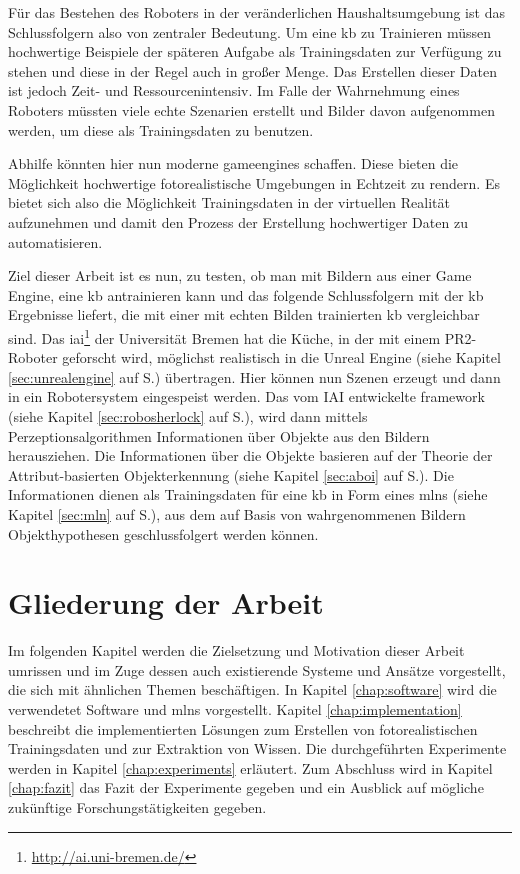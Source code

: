 Für das Bestehen des Roboters in der veränderlichen Haushaltsumgebung ist das Schlussfolgern also von zentraler Bedeutung. Um eine \gls{kb} zu Trainieren müssen hochwertige Beispiele der späteren Aufgabe als Trainingsdaten zur Verfügung zu stehen und diese in der Regel auch in großer Menge. Das Erstellen dieser Daten ist jedoch Zeit- und Ressourcenintensiv. Im Falle der Wahrnehmung eines Roboters müssten viele echte Szenarien erstellt und Bilder davon aufgenommen werden, um diese als Trainingsdaten zu benutzen. \par      
Abhilfe könnten hier nun moderne \glspl{gameengine} schaffen. Diese bieten die Möglichkeit hochwertige fotorealistische Umgebungen in Echtzeit zu rendern. Es bietet sich also die Möglichkeit Trainingsdaten in der virtuellen Realität aufzunehmen und damit den Prozess der Erstellung hochwertiger Daten zu automatisieren. \par  
Ziel dieser Arbeit ist es nun, zu testen, ob man mit Bildern aus einer Game Engine, eine \gls{kb} antrainieren kann und das folgende Schlussfolgern mit der \gls{kb} Ergebnisse liefert, die mit einer mit echten Bilden trainierten \gls{kb} vergleichbar sind. Das \gls{iai}\footnote{\url{http://ai.uni-bremen.de/}} der Universität Bremen hat die Küche, in der mit einem PR2-Roboter geforscht wird, möglichst realistisch in die Unreal Engine (siehe Kapitel \ref{sec:unrealengine} auf S.\pageref{sec:unrealengine}) übertragen. Hier können nun Szenen erzeugt und dann in ein Robotersystem eingespeist werden. Das vom IAI entwickelte \gls{framework} \robosherlock (siehe Kapitel \ref{sec:robosherlock} auf S.\pageref{sec:robosherlock}), wird dann mittels Perzeptionsalgorithmen Informationen über Objekte aus den Bildern herausziehen. Die Informationen über die Objekte basieren auf der Theorie der Attribut-basierten Objekterkennung (siehe Kapitel \ref{sec:aboi} auf S.\pageref{sec:aboi}). Die Informationen dienen als Trainingsdaten für eine \gls{kb} in Form eines \gls{mlns} (siehe Kapitel \ref{sec:mln} auf S.\pageref{sec:mln}), aus dem auf Basis von wahrgenommenen Bildern Objekthypothesen  geschlussfolgert werden können.  

\section{Gliederung der Arbeit}
\label{sec:gliederung}

Im folgenden Kapitel werden die Zielsetzung und Motivation dieser Arbeit umrissen und im Zuge dessen auch existierende Systeme und Ansätze vorgestellt, die sich mit ähnlichen Themen beschäftigen. In Kapitel \ref{chap:software} wird die verwendetet Software und \glspl{mln} vorgestellt. Kapitel \ref{chap:implementation} beschreibt die implementierten Lösungen zum Erstellen von fotorealistischen Trainingsdaten und zur Extraktion von Wissen. Die durchgeführten Experimente werden in Kapitel \ref{chap:experiments} erläutert. Zum Abschluss wird in Kapitel \ref{chap:fazit} das Fazit der Experimente gegeben und ein Ausblick auf mögliche zukünftige Forschungstätigkeiten gegeben. 

   

